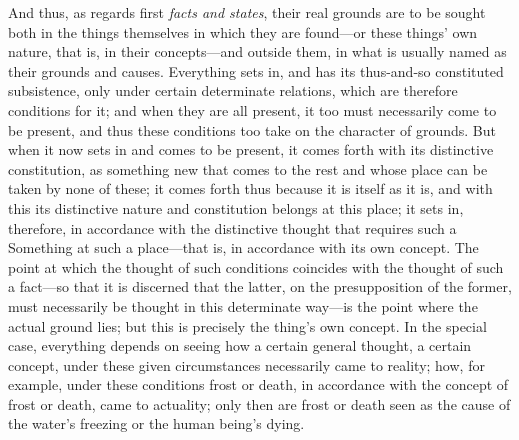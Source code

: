 \documentclass[12pt,a4paper]{book}
\begin{document}
And thus, as regards first \emph{facts and states}, their real grounds are to be
sought both in the things themselves in which they are found---or these things' own
nature, that is, in their concepts---and outside them, in what is usually named as
their grounds and causes. Everything sets in, and has its thus-and-so constituted
subsistence, only under certain determinate relations, which are therefore
conditions for it; and when they are all present, it too must necessarily come to be
present, and thus these conditions too take on the character of grounds. But when it
now sets in and comes to be present, it comes forth with its distinctive
constitution, as something new that comes to the rest and whose place can be taken by
none of these; it comes forth thus because it is itself as it is, and with this its
distinctive nature and constitution belongs at this place; it sets in, therefore, in
accordance with the distinctive thought that requires such a Something at such a
place---that is, in accordance with its own concept. The point at which the thought
of such conditions coincides with the thought of such a fact---so that it is
discerned that the latter, on the presupposition of the former, must necessarily be
thought in this determinate way---is the point where the actual ground lies; but
this is precisely the thing's own concept. In the special case, everything depends
on seeing how a certain general thought, a certain concept, under these given
circumstances necessarily came to reality; how, for example, under these conditions
frost or death, in accordance with the concept of frost or death, came to actuality;
only then are frost or death seen as the cause of the water's freezing or the human
being's dying.
\end{document}

